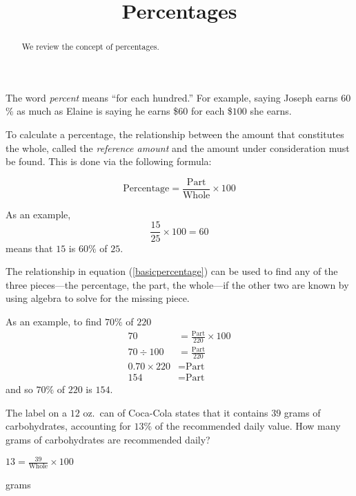 \documentclass{ximera}
\title{Percentages}
\begin{document}
\begin{abstract}
We review the concept of percentages.
\end{abstract}
\maketitle

The word \emph{percent} means ``for each hundred.'' For example, saying Joseph earns $60$\% as much as Elaine is saying he earns \$$60$ for each \$$100$ she earns.

To calculate a percentage, the relationship between the amount that constitutes the whole, called the \emph{reference amount} and the amount under consideration must be found. This is done via the following formula:

\begin{equation}\label{basicpercentage}
\text{Percentage}=\frac{\text{Part}}{\text{Whole}}\times 100
\end{equation}


As an example,
\[
\frac{15}{25}\times 100=60
\]
means that $15$ is $60\%$ of $25$.

The relationship in equation (\ref{basicpercentage}) can be used to find any of the three pieces---the percentage, the part, the whole---if the other two are known by using algebra to solve for the missing piece.

As an example, to find $70\%$ of $220$
\begin{align*}
70&=\frac{\text{Part}}{220}\times 100\\
70\div 100 &=\frac{\text{Part}}{220}\\
0.70\times 220 &=\text{Part}\\
154&=\text{Part}
\end{align*}
and so $70\%$ of $220$ is $154$.

\begin{question}
The label on a $12$ oz.\ can of Coca-Cola states that it contains $39$ grams of carbohydrates, accounting for $13$\% of the recommended daily value. How many grams of carbohydrates are recommended daily?

\begin{hint}
$\displaystyle 13=\frac{39}{\text{Whole}}\times 100$
\end{hint}
 grams

\end{question}
\end{document}
